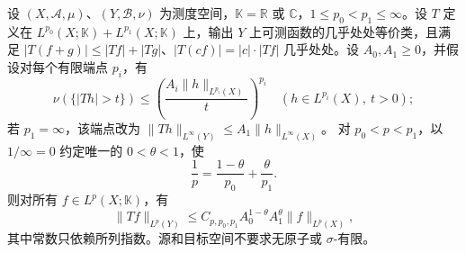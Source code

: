 \begin{theorem}[Marcinkiewicz]\label{b2:thm:17-marcinkiewicz}
设 \((X,\mathcal A,\mu)\)、\((Y,\mathcal B,\nu)\) 为测度空间，\(\mathbb K=\mathbb R\) 或 \(\mathbb C\)，\(1\leq p_0<p_1\leq\infty\)。设 \(T\) 定义在 \(L^{p_0}(X;\mathbb K)+L^{p_1}(X;\mathbb K)\) 上，输出 \(Y\) 上可测函数的几乎处处等价类，且满足 \(|T(f+g)|\leq|Tf|+|Tg|\)、\(|T(cf)|=|c|\cdot|Tf|\) 几乎处处。设 \(A_0,A_1\geq0\)，并假设对每个有限端点 \(p_i\)，有
\[
 \nu(\{|Th|>t\})\leq
 \left(\dfrac{A_i\|h\|_{L^{p_i}(X)}}{t}\right)^{p_i}
 \quad(h\in L^{p_i}(X),\ t>0);
\]
若 \(p_1=\infty\)，该端点改为
\(\|Th\|_{L^\infty(Y)}\leq A_1\|h\|_{L^\infty(X)}\)。
对 \(p_0<p<p_1\)，以 \(1/\infty=0\) 约定唯一的 \(0<\theta<1\)，使
\[
 \frac1p=\frac{1-\theta}{p_0}+\frac\theta{p_1}.
\]
则对所有 \(f\in L^p(X;\mathbb K)\)，有
\[
 \|Tf\|_{L^p(Y)}
 \leq C_{p,p_0,p_1}A_0^{1-\theta}A_1^\theta\|f\|_{L^p(X)},
\]
其中常数只依赖所列指数。源和目标空间不要求无原子或 \(\sigma\)-有限。
\end{theorem}
